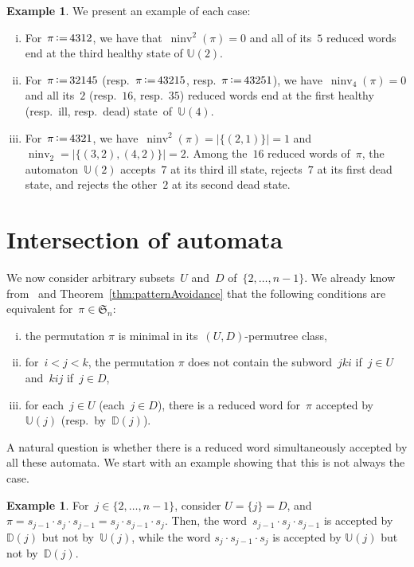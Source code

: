 \documentclass[11pt]{article}
\theoremstyle{definition}
\newtheorem{example}[theo]{Example}
\numberwithin{equation}{section}
\newcommand{\fS}{\mathfrak{S}}
\newcommand{\eqdef}{\mbox{\,\raisebox{0.2ex}{\scriptsize\ensuremath{\mathrm:}}\ensuremath{=}\,}}
\DeclareMathOperator{\ninv}{ninv}
\newcommand{\automatonU}{\mathbb{U}}
\newcommand{\automatonD}{\mathbb{D}}
\begin{document}
\begin{example}\label{exm:sameStateAcceptedReducedExpressionsRefined}
We present an example of each case:
\begin{enumerate}[(i)]
	\item For~$\pi \eqdef 4312$, we have that~$\ninv^2(\pi)=0$ and all of its~$5$ reduced words end at the third healthy state of $\automatonU(2)$.
	\item For~$\pi \eqdef 32145$ (resp.~$\pi \eqdef 43215$, resp.~$\pi \eqdef 43251$), we have~$\ninv_4(\pi) = 0$ and all its~$2$ (resp.~$16$, resp.~$35$) reduced words end at the first healthy (resp.~ill, resp.~dead) state~of~$\automatonU(4)$.
	\item For~$\pi \eqdef 4321$, we have~$\ninv^2(\pi) = |\{(2,1)\}| = 1$ and $\ninv_2 = |\{(3,2),(4,2)\}| = 2$. Among the~$16$ reduced words of~$\pi$, the automaton~$\automatonU(2)$ accepts~$7$ at its third ill state, rejects~$7$ at its first dead state, and rejects the other~$2$ at its second dead state.
\end{enumerate}
\end{example}
\section{Intersection of automata}\label{sec:intersectionsAutomata}

We now consider arbitrary subsets~$U$ and~$D$ of~$\{2, \dots, n-1\}$.
We already know from~\cite{PilaudPons-permutrees} and Theorem~\ref{thm:patternAvoidance} that the following conditions are equivalent for~$\pi \in \fS_n$:
\begin{enumerate}[(i)]
	\item the permutation $\pi$ is minimal in its~$(U,D)$-permutree class, 
	\item for~$i < j < k$, the permutation $\pi$ does not contain the subword~$jki$ if~$j \in U$ and~$kij$ if~$j \in D$,
	\item for each~$j \in U$ (each~$j \in D$), there is a reduced word for~$\pi$ accepted by~$\automatonU(j)$ (resp.~by~$\automatonD(j)$).
\end{enumerate}
A natural question is whether there is a reduced word simultaneously accepted by all these automata.
We start with an example showing that this is not always the case.

\begin{example}\label{exm:problemUDintersect}
For~$j \in \{2, \dots, n-1\}$, consider $U = \{j\} = D$, and~$\pi = s_{j-1} \cdot s_j \cdot s_{j-1} = s_j \cdot s_{j-1} \cdot s_j$.
Then, the word~$s_{j-1} \cdot s_j \cdot s_{j-1}$ is accepted by $\automatonD(j)$ but not by~$\automatonU(j)$, while the word $s_j \cdot s_{j-1} \cdot s_j$ is accepted by $\automatonU(j)$ but not by~$\automatonD(j)$.
\end{example}
\end{document}
